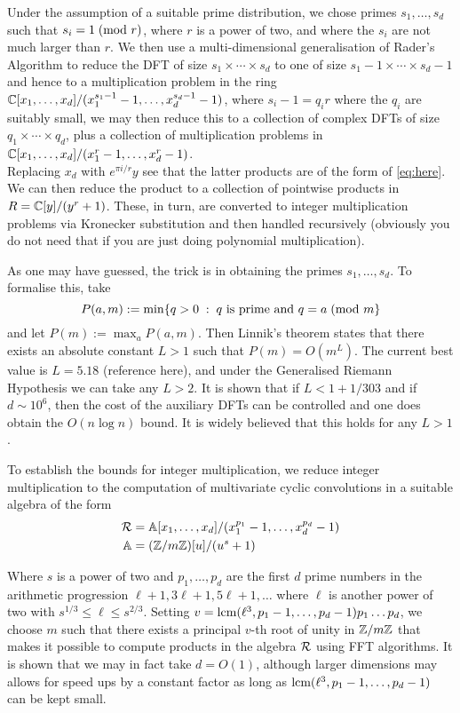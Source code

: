 Under the assumption of a suitable prime distribution, we chose primes $s_1, \ldots, s_d$ such that $s_i = 1 \;(\textrm{mod } r)$, where $r$ is a power of two, and where the $s_i$ are not much larger than $r$. We then use a multi-dimensional generalisation of Rader's Algorithm to reduce the DFT of size $s_1 \times \cdots \times s_d$ to one of size $s_1-1 \times \cdots \times s_d-1$ and hence to a multiplication problem in the ring ${\mathbb C}[x_1, \ldots, x_d] / (x_1^{s_1 - 1} - 1, \ldots, x_d^{s_d - 1} - 1)$, where $s_i - 1 = q_i r$ where the $q_i$ are suitably small, we may then reduce this to a collection of complex DFTs of size $q_1 \times \cdots \times q_d$, plus a collection of multiplication problems in ${\mathbb C}[x_1, \ldots, x_d] / (x_1^r - 1, \ldots, x_d^r - 1)$. \\
Replacing $x_d$ with $e^{\pi i / r}y$ see that the latter products are of the form of \ref{eq:here}.  We can then reduce the product to a collection of pointwise products in $R = {\mathbb C}[y] / (y^r + 1)$. These, in turn, are converted to integer multiplication problems via Kronecker substitution and then handled recursively (obviously you do not need that if you are just doing polynomial multiplication).

As one may have guessed, the trick is in obtaining the primes $s_1, \ldots, s_d$. To formalise this, take
\[
    P(a, m) := \min\{q > 0\;:\; q \textrm{ is prime and } q = a \;(\textrm{mod } m\}
\]
and let $P(m) := \max_a P(a, m)$. Then Linnik's theorem states that there exists an absolute constant $L > 1$ such that $P(m) = O(m^L)$. The current best value is $L = 5.18$ (reference here), and under the Generalised Riemann Hypothesis we can take any $L > 2$. It is shown \cite{ffnlogn} that if $L < 1 + 1/303$ and if $d \sim 10^6$, then the cost of the auxiliary DFTs can be controlled and one does obtain the $O(n \log n)$ bound. It is widely believed that this holds for any $L > 1$.

To establish the bounds for integer multiplication, we reduce integer multiplication to the computation of multivariate cyclic convolutions in a suitable algebra of the form
\begin{align*}
    \mathcal R &= \mathbb{A}[x_1, \ldots, x_d] / (x_1^{p_1} - 1, \ldots, x_d^{p_d} - 1)\\
    \mathbb{A} &= ({\mathbb Z} / m{\mathbb Z})[u] / (u^s + 1)
\end{align*}

Where $s$ is a power of two and $p_1, \ldots, p_d$ are the first $d$ prime numbers in the arithmetic progression $\ell + 1, 3\ell + 1, 5\ell + 1, \ldots$ where $\ell$ is another power of two with $s^{1/3} \leq \ell \leq s^{2/3}$.  Setting $v = \textrm{lcm}(\ell^3, p_1 - 1, \ldots, p_d - 1)p_1\dots p_d$, we choose $m$ such that there exists a principal $v$-th root of unity in ${\mathbb Z}/m{\mathbb Z}$ that makes it possible to compute products in the algebra $\mathcal R$ using FFT algorithms. It is shown that we may in fact take $d = O(1)$, although larger dimensions may allows for speed ups by a constant factor as long as $\textrm{lcm}(\ell^3, p_1 - 1, \ldots, p_d - 1)$ can be kept small.


